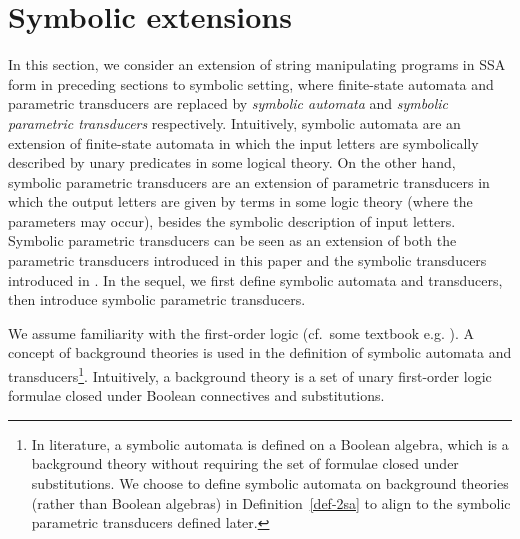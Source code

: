 
\section{Symbolic extensions}
\label{sec:symbolic}

In this section, we consider an extension of string manipulating programs in SSA form in preceding sections to symbolic setting, where finite-state automata and parametric transducers are replaced by \emph{symbolic automata} \cite{NG01,DV14} and \emph{symbolic parametric transducers} respectively.
%
Intuitively, symbolic automata are an extension of finite-state automata in which the input letters are symbolically described by unary predicates  in some logical theory. On the other hand, symbolic parametric transducers are an extension of parametric transducers in which the output letters are given by terms in some logic theory (where the parameters may occur), besides the symbolic description of input letters.
Symbolic parametric transducers can be seen as an extension of both the parametric transducers introduced in this paper and the symbolic transducers introduced in \cite{VHLMB12}.
In the sequel, we first define symbolic automata and transducers, then introduce symbolic parametric transducers.


We assume familiarity with the 
first-order logic (cf.\ some textbook e.g. \cite{EFT94}).
A concept of background theories is used in the definition of symbolic automata and transducers\footnote{In literature, a symbolic automata is defined on a Boolean algebra, which is a background theory without requiring the set of formulae closed under substitutions. We choose to define symbolic automata on background theories (rather than Boolean algebras) in Definition~\ref{def-2sa} to align to the symbolic parametric transducers defined later.}.
Intuitively, 
a  background theory is a set of unary first-order logic formulae closed under Boolean connectives and substitutions. 
 
